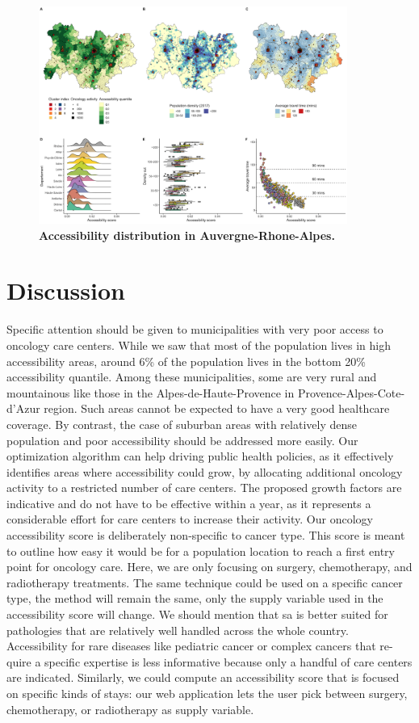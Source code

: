 \begin{figure}[H]
    \includegraphics[width=0.9\textwidth]{images/camion/region_accessibility/accessibility_Auvergne-Rhone-Alpes.png}
    \centering
    \caption{
        \textbf{Accessibility distribution in Auvergne-Rhone-Alpes.}
    }
\end{figure}

\section{Discussion}

Specific attention should be given to municipalities with very poor access to
oncology care centers. While we saw that most of the population lives in high
accessibility areas, around 6\% of the population lives in the bottom 20\%
accessibility quantile. Among these municipalities, some are very rural and
mountainous like those in the Alpes-de-Haute-Provence in
Provence-Alpes-Cote-d'Azur region. Such areas cannot be expected to have a very
good healthcare coverage. By contrast, the case of suburban areas with
relatively dense population and poor accessibility should be addressed more
easily. Our optimization algorithm can help driving public health policies, as
it effectively identifies areas where accessibility could grow, by allocating
additional oncology activity to a restricted number of care centers. The
proposed growth factors are indicative and do not have to be effective within a
year, as it represents a considerable effort for care centers to increase their
activity. Our oncology accessibility score is deliberately non-specific to
cancer type. This score is meant to outline how easy it would be for a
population location to reach a first entry point for oncology care. Here, we are
only focusing on surgery, chemotherapy, and radiotherapy treatments. The same
technique could be used on a specific cancer type, the method will remain the
same, only the supply variable used in the accessibility score will change. We
should mention that \ac{sa} is better suited for pathologies that are relatively
well handled across the whole country. Accessibility for rare diseases like
pediatric cancer or complex cancers that re-quire a specific expertise is less
informative because only a handful of care centers are indicated. Similarly, we
could compute an accessibility score that is focused on specific kinds of stays:
our web application lets the user pick between surgery, chemotherapy, or
radiotherapy as supply variable.
